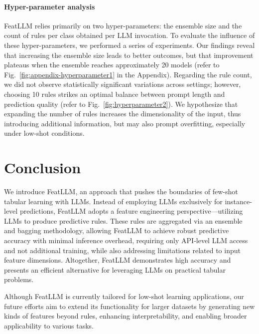 \vspace*{-0.12in}
\paragraph{Hyper-parameter analysis}
\textsf{FeatLLM} relies primarily on two hyper-parameters: the ensemble size and the count of rules per class obtained per LLM invocation. To evaluate the influence of these hyper-parameters, we performed a series of experiments. Our findings reveal that increasing the ensemble size leads to better outcomes, but that improvement plateaus when the ensemble reaches approximately 20 models (refer to Fig.~\ref{fig:appendix-hyperparameter1} in the Appendix). Regarding the rule count, we did not observe statistically significant variations across settings; however, choosing 10 rules strikes an optimal balance between prompt length and prediction quality (refer to Fig.~\ref{fig:hyperparameter2}). We hypothesize that expanding the number of rules increases the dimensionality of the input, thus introducing additional information, but may also prompt overfitting, especially under low-shot conditions.

\section{Conclusion}
We introduce \textsf{FeatLLM}, an approach that pushes the boundaries of few-shot tabular learning with LLMs. Instead of employing LLMs exclusively for instance-level predictions, \textsf{FeatLLM} adopts a feature engineering perspective—utilizing LLMs to produce predictive rules. These rules are aggregated via an ensemble and bagging methodology, allowing \textsf{FeatLLM} to achieve robust predictive accuracy with minimal inference overhead, requiring only API-level LLM access and not additional training, while also addressing limitations related to input feature dimensions. Altogether, \textsf{FeatLLM} demonstrates high accuracy and presents an efficient alternative for leveraging LLMs on practical tabular problems.

Although \textsf{FeatLLM} is currently tailored for low-shot learning applications, our future efforts aim to extend its functionality for larger datasets by generating new kinds of features beyond rules, enhancing interpretability, and enabling broader applicability to various tasks.


